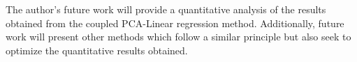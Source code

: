 \documentclass[preprint,12pt]{elsarticle}
\begin{document}
The author's future work will provide a quantitative analysis of the results obtained from the coupled PCA-Linear regression method. Additionally, future work will present other methods which follow a similar principle but also seek to optimize the quantitative results obtained.



\clearpage 
 
%
%

  
\clearpage 

%
\clearpage  
\listoffigures
\clearpage
 

\clearpage
\appendix
\end{document}
